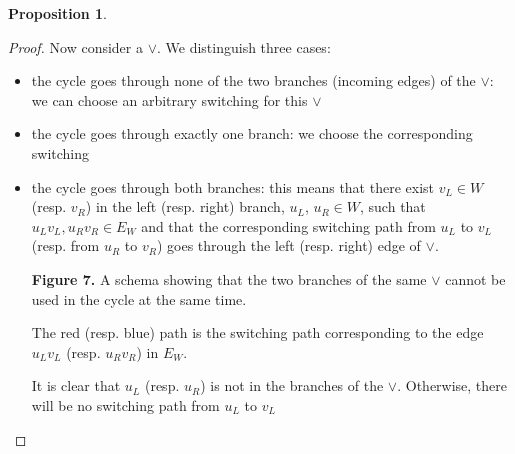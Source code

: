 \documentclass[conference,twosided,10pt]{IEEEtran}
\theoremstyle{definition}
\newtheorem{proposition}[thm]{Proposition}
\begin{document}
\begin{proposition}
\begin{proof}
  Now consider a $\vee$. We distinguish three cases:
  \begin{itemize}
    \item the cycle goes through none of the two branches (incoming edges) of
	    the $\vee$: we can choose an
	    arbitrary switching for this $\vee$
    \item the cycle goes through exactly one branch: we choose the corresponding
	    switching
    \item the cycle goes through both branches:
	    this means that there exist $v_L \in W$ (resp. $v_R$) in the left
		  (resp. right) branch, $u_L$, $u_R \in W$, such that
		  $u_Lv_L, u_Rv_R \in E_W$ and that the corresponding switching
		  path from $u_L$ to $v_L$ (resp. from $u_R$ to $v_R$) goes
		  through the left (resp. right) edge of $\vee$.
		  
    \begin{center}	
    
    {\bf Figure 7.} A schema showing that the two branches of the same $\vee$ cannot be used in the cycle at the same time. 
    \end{center}
    
    The red (resp. blue) path is the switching path corresponding to the edge $u_Lv_L$ (resp. $u_Rv_R$) in $E_W$.  
    
    It is clear that $u_L$ (resp. $u_R$) is not in the branches of the
	 $\vee$. Otherwise, there will be no switching path from $u_L$ to $v_L$ 


\end{itemize}
\end{proof}
\end{proposition}
\end{document}
